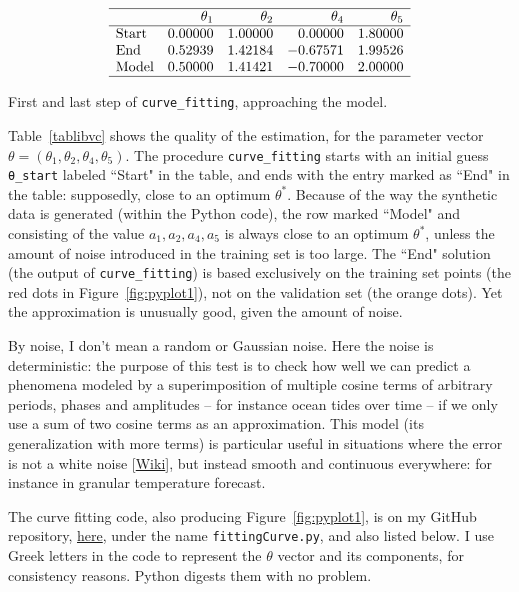 \documentclass[oneside,10pt]{book}
\renewcommand{\arraystretch}{1.4} %
\begin{document}
\renewcommand{\arraystretch}{1.2} %
\begin{table}[H]
\[
\begin{array}{lrrrr}
\hline
   & \theta_1 & \theta_2  & \theta_4 & \theta_5  \\
\hline
\text{Start}	&	0.00000	&	1.00000	& 0.00000	 &  1.80000\\
\text{End}	&	0.52939	&	1.42184	&-0.67571	 &  1.99526\\
\text{Model}	&	0.50000	&	1.41421	& -0.70000	 & 2.00000  \\
\hline
\end{array}
\]
\caption{\label{tablibvc} First and last step of \texttt{curve\_fitting}, approaching the model.}
\end{table}
\renewcommand{\arraystretch}{1.0} %

Table~\ref{tablibvc} shows the quality of the estimation, for the parameter vector $\theta=(\theta_1,\theta_2,\theta_4,\theta_5)$.
The procedure \texttt{curve\_fitting} starts with an initial guess \texttt{\textcolor{gray2}{θ}\_start} labeled ``Start" in the table, and
 ends  with the entry marked as ``End" in the table: supposedly, close to an optimum $\theta^*$. Because of the way the   \textcolor{index}{synthetic data} is generated (within the Python code), the row marked ``Model" and consisting of the value 
 $a_1,a_2,a_4,a_5$ is always close to an optimum $\theta^*$,
 unless the amount of noise introduced in the training set is too large. The ``End" solution (the output of
 \texttt{curve\_fitting}) is based exclusively on the training set points (the red dots 
 in Figure~\ref{fig:pyplot1}), not on the \textcolor{index}{validation set} (the orange dots). Yet the approximation is unusually good, given the amount of noise.

 By noise, I don't mean a random or Gaussian noise. Here the noise is deterministic: the purpose of this test is to check how well we can predict a phenomena modeled by a superimposition of multiple cosine terms of arbitrary periods, phases and amplitudes -- for instance ocean tides over time -- if we only use a sum of two cosine terms as an approximation. This model (its generalization with more terms)  is particular useful in situations where the error is not a \textcolor{index}{white noise} [\href{https://en.wikipedia.org/wiki/White_noise}{Wiki}], but instead smooth and continuous everywhere: for instance in granular temperature forecast.  

The curve fitting code, also producing Figure~\ref{fig:pyplot1}, is on my GitHub repository,
 \href{https://github.com/VincentGranville/Machine-Learning/blob/main/Source\%20Code/fittingCurve.py}{here},
 under the name \texttt{fittingCurve.py}, and also listed below. I use Greek letters in the code  to represent the $\theta$ vector and its
 components, for consistency reasons. Python digests them with no problem.  \\
 
\end{document}
